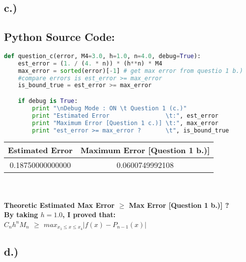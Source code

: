 \documentclass{article}
\begin{document}
\pagebreak



\subsection*{c.)}
\subsection*{Python Source Code: }
\begin{lstlisting}[language=Python]
def question_c(error, M4=3.0, h=1.0, n=4.0, debug=True):
    est_error = (1. / (4. * n)) * (h**n) * M4
    max_error = sorted(error)[-1] # get max error from questio 1 b.)
    #compare errors is est_error >= max_error
    is_bound_true = est_error >= max_error

    if debug is True:
        print "\nDebug Mode : ON \t Question 1 (c.)"
        print "Estimated Error                \t:", est_error
        print "Maximum Error [Question 1 c.)] \t:", max_error
        print "est_error >= max_error ?       \t", is_bound_true
\end{lstlisting}

\begin{center}
    \begin{tabular}{||c| c||} 
    \hline
    \textbf{Estimated Error} & \textbf{Maximum Error [Question 1 b.)]} \\ [0.5ex] 
    \hline\hline
    0.18750000000000 & 0.0600749992108 \\ [1ex] 
    \hline
    \end{tabular}
\end{center}
\\
\\
\textbf{Theoretic Estimated Max Error $\geq$ Max Error [Question 1 b.)] ? \\
By taking $h = 1.0 $, I proved that: \\
 $C_n h^n M_n$ $\geq$ $max_{x_1 \leq x \leq x_4} |f(x) - P_{n - 1}(x)|$  }
\pagebreak

\subsection*{d.)}
\end{document}
